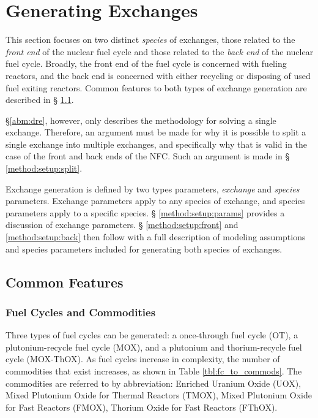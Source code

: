 
\section{Generating Exchanges}\label{method:setup}

This section focuses on two distinct \textit{species} of exchanges, those
related to the \textit{front end} of the nuclear fuel cycle and those related to
the \textit{back end} of the nuclear fuel cycle. Broadly, the front end of the
fuel cycle is concerned with fueling reactors, and the back end is concerned
with either recycling or disposing of used fuel exiting reactors. Common
features to both types of exchange generation are described in \S
\ref{method:setup:features}.

\S \ref{abm:dre}, however, only describes the methodology for solving a single
exchange. Therefore, an argument must be made for why it is possible to split a
single exchange into multiple exchanges, and specifically why that is valid in
the case of the front and back ends of the NFC. Such an argument is made in \S
\ref{method:setup:split}.

Exchange generation is defined by two types parameters, \textit{exchange} and
\textit{species} parameters. Exchange parameters apply to any species of
exchange, and species parameters apply to a specific species. \S
\ref{method:setup:params} provides a discussion of exchange parameters. \S
\ref{method:setup:front} and \ref{method:setup:back} then follow with a full
description of modeling assumptions and species parameters included for
generating both species of exchanges.

\subsection{Common Features}\label{method:setup:features}

\subsubsection{Fuel Cycles and Commodities}

Three types of fuel cycles can be generated: a once-through fuel cycle (OT), a
plutonium-recycle fuel cycle (MOX), and a plutonium and thorium-recycle fuel
cycle (MOX-ThOX). As fuel cycles increase in complexity, the number of
commodities that exist increases, as shown in Table \ref{tbl:fc_to_commods}. The
commodities are referred to by abbreviation: Enriched Uranium Oxide (UOX), Mixed
Plutonium Oxide for Thermal Reactors (TMOX), Mixed Plutonium Oxide for Fast
Reactors (FMOX), Thorium Oxide for Fast Reactors (FThOX).

